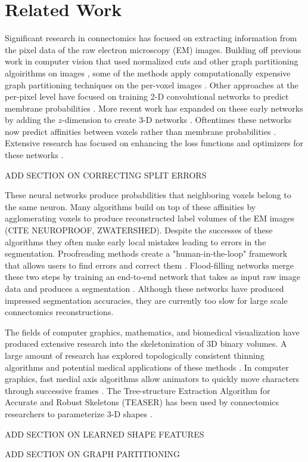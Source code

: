 \section{Related Work}

Significant research in connectomics has focused on extracting information from the pixel data of the raw electron microscopy (EM) images. Building off previous work in computer vision that used normalized cuts and other graph partitioning algoirithms on images \cite{kappes2016higher,shi2000normalized,tatiraju2008image}, some of the methods apply computationally expensive graph partitioning techniques on the per-voxel images \cite{andres2012globally}. Other approaches at the per-pixel level have focused on training 2-D convolutional networks to predict membrane probabilities \cite{ciresan2012deep}. More recent work has expanded on these early networks by adding the $z$-dimension to create 3-D networks \cite{lee2015recursive}. Oftentimes these networks now predict affinities between voxels rather than membrane probabilities \cite{ronneberger2015u}. Extensive research has focused on enhancing the loss functions and optimizers for these networks \cite{chatfield2014return,maas2013rectifier,nesterov1983method}.

ADD SECTION ON CORRECTING SPLIT ERRORS

These neural networks produce probabilities that neighboring voxels belong to the same neuron. Many algorithms build on top of these affinities by agglomerating voxels to produce reconstructed label volumes of the EM images \cite{seymour2016rhoananet,nunez2014graph,parag2017anisotropic} (CITE NEUROPROOF, ZWATERSHED). Despite the successes of these algorithms they often make early local mistakes leading to errors in the segmentation. Proofreading methods create a "human-in-the-loop" framework that allows users to find errors and correct them \cite{haehn2017scalable,haehn2017guided,haehn2014design}. Flood-filling networks merge these two steps by training an end-to-end network that takes as input raw image data and produces a segmentation \cite{januszewski2016flood}. Although these networks have produced impressed segmentation accuracies, they are currently too slow for large scale connectomics reconstructions. 

The fields of computer graphics, mathematics, and biomedical visualization have produced extensive research into the skeletonization of 3D binary volumes. A large amount of research has explored topologically consistent thinning algorithms and potential medical applications of these methods \cite{palagyi20003d,palagyi2001sequential}. In computer graphics, fast medial axis algorithms allow animators to quickly move characters through successive frames \cite{baran2007automatic,bharaj2012automatically}. The Tree-structure Extraction Algorithm for Accurate and Robust Skeletons (TEASER) has been used by connectomics researchers to parameterize 3-D shapes \cite{sato2000teasar,zhao2014automatic}. 

ADD SECTION ON LEARNED SHAPE FEATURES

ADD SECTION ON GRAPH PARTITIONING